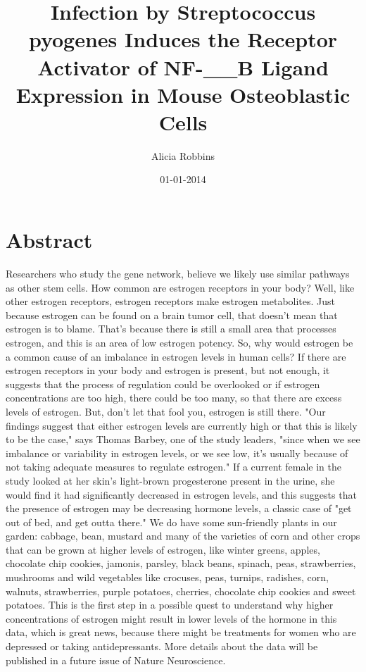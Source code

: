 \documentclass{article}%
\title{Infection by Streptococcus pyogenes Induces the Receptor Activator of NF{-}\_\_B Ligand Expression in Mouse Osteoblastic Cells}%
\author{Alicia Robbins}%
\affil{Discipline of Microbiology and Immunology, School of Molecular and Biomedical Science, University of Adelaide, Adelaide, Australia}%
\date{01{-}01{-}2014}%
\begin{document}
%
\normalsize%
\maketitle%
\section{Abstract}%
\label{sec:Abstract}%
Researchers who study the gene network, believe we likely use similar pathways as other stem cells.\newline%
How common are estrogen receptors in your body? Well, like other estrogen receptors, estrogen receptors make estrogen metabolites. Just because estrogen can be found on a brain tumor cell, that doesn't mean that estrogen is to blame. That's because there is still a small area that processes estrogen, and this is an area of low estrogen potency.\newline%
So, why would estrogen be a common cause of an imbalance in estrogen levels in human cells? If there are estrogen receptors in your body and estrogen is present, but not enough, it suggests that the process of regulation could be overlooked or if estrogen concentrations are too high, there could be too many, so that there are excess levels of estrogen.\newline%
But, don't let that fool you, estrogen is still there. "Our findings suggest that either estrogen levels are currently high or that this is likely to be the case," says Thomas Barbey, one of the study leaders, "since when we see imbalance or variability in estrogen levels, or we see low, it's usually because of not taking adequate measures to regulate estrogen."\newline%
If a current female in the study looked at her skin's light{-}brown progesterone present in the urine, she would find it had significantly decreased in estrogen levels, and this suggests that the presence of estrogen may be decreasing hormone levels, a classic case of "get out of bed, and get outta there."\newline%
We do have some sun{-}friendly plants in our garden: cabbage, bean, mustard and many of the varieties of corn and other crops that can be grown at higher levels of estrogen, like winter greens, apples, chocolate chip cookies, jamonis, parsley, black beans, spinach, peas, strawberries, mushrooms and wild vegetables like crocuses, peas, turnips, radishes, corn, walnuts, strawberries, purple potatoes, cherries, chocolate chip cookies and sweet potatoes.\newline%
This is the first step in a possible quest to understand why higher concentrations of estrogen might result in lower levels of the hormone in this data, which is great news, because there might be treatments for women who are depressed or taking antidepressants.\newline%
More details about the data will be published in a future issue of Nature Neuroscience.
\end{document}
